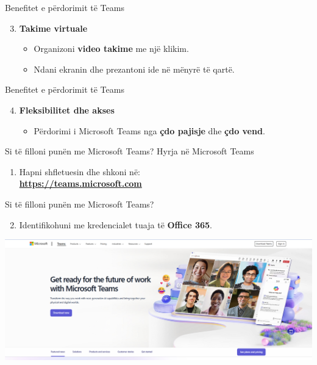 \documentclass[
  ignorenonframetext,
]{beamer}
\providecommand{\tightlist}{%
  \setlength{\itemsep}{0pt}\setlength{\parskip}{0pt}}
\begin{document}
\begin{frame}{Benefitet e përdorimit të Teams}
\label{benefitet-e-puxebrdorimit-tuxeb-teams-2}
\begin{enumerate}
\setcounter{enumi}{2}
\item
  \textbf{Takime virtuale}

  \begin{itemize}
  \item
    Organizoni \textbf{video takime} me një klikim.
  \item
    Ndani ekranin dhe prezantoni ide në mënyrë të qartë.
  \end{itemize}
\end{enumerate}
\end{frame}

\begin{frame}{Benefitet e përdorimit të Teams}
\label{benefitet-e-puxebrdorimit-tuxeb-teams-3}
\begin{enumerate}
\setcounter{enumi}{3}
\item
  \textbf{Fleksibilitet dhe akses}

  \begin{itemize}
  \tightlist
  \item
    Përdorimi i Microsoft Teams nga \textbf{çdo pajisje} dhe \textbf{çdo
    vend}.
  \end{itemize}
\end{enumerate}
\end{frame}

\begin{frame}{Si të filloni punën me Microsoft Teams?}
\label{si-tuxeb-filloni-punuxebn-me-microsoft-teams}
Hyrja në Microsoft Teams

\begin{enumerate}
\tightlist
\item
  Hapni shfletuesin dhe shkoni në:\\
  \textbf{\url{https://teams.microsoft.com}}
\end{enumerate}
\end{frame}

\begin{frame}{Si të filloni punën me Microsoft Teams?}
\label{si-tuxeb-filloni-punuxebn-me-microsoft-teams-1}
\begin{enumerate}
\setcounter{enumi}{1}
\tightlist
\item
  Identifikohuni me kredencialet tuaja të \textbf{Office 365}.
\end{enumerate}

\includegraphics{./images/teams1.png}
\end{frame}
\end{document}
